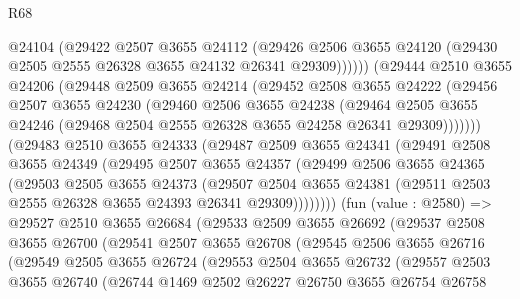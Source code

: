 \begin{lexlean}{R68}
\begin{coremodule}
              @24104
              (@29422
                @2507
                @3655
                @24112
                (@29426
                  @2506
                  @3655
                  @24120
                  (@29430 @2505 @2555 @26328 @3655 @24132 @26341 @29309))))))
        (@29444
          @2510
          @3655
          @24206
          (@29448
            @2509
            @3655
            @24214
            (@29452
              @2508
              @3655
              @24222
              (@29456
                @2507
                @3655
                @24230
                (@29460
                  @2506
                  @3655
                  @24238
                  (@29464
                    @2505
                    @3655
                    @24246
                    (@29468 @2504 @2555 @26328 @3655 @24258 @26341 @29309)))))))
        (@29483
          @2510
          @3655
          @24333
          (@29487
            @2509
            @3655
            @24341
            (@29491
              @2508
              @3655
              @24349
              (@29495
                @2507
                @3655
                @24357
                (@29499
                  @2506
                  @3655
                  @24365
                  (@29503
                    @2505
                    @3655
                    @24373
                    (@29507
                      @2504
                      @3655
                      @24381
                      (@29511 @2503 @2555 @26328 @3655 @24393 @26341 @29309))))))))
        (fun (value : @2580) =>
        @29527
          @2510
          @3655
          @26684
          (@29533
            @2509
            @3655
            @26692
            (@29537
              @2508
              @3655
              @26700
              (@29541
                @2507
                @3655
                @26708
                (@29545
                  @2506
                  @3655
                  @26716
                  (@29549
                    @2505
                    @3655
                    @26724
                    (@29553
                      @2504
                      @3655
                      @26732
                      (@29557
                        @2503
                        @3655
                        @26740
                        (@26744
                          @1469
                          @2502
                          @26227
                          @26750
                          @3655
                          @26754
                          @26758

\end{coremodule}
\end{lexlean}
